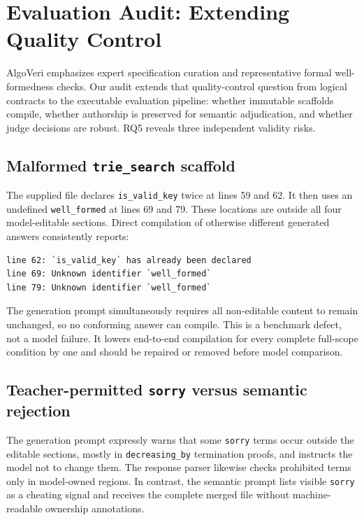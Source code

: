 \documentclass{article}
\newcommand{\task}[1]{\texttt{#1}}
\begin{document}
\section{Evaluation Audit: Extending Quality Control}
\label{sec:benchmark-audit}

AlgoVeri emphasizes expert specification curation and representative formal
well-formedness checks.  Our audit extends that quality-control question from logical
contracts to the executable evaluation pipeline: whether immutable scaffolds compile,
whether authorship is preserved for semantic adjudication, and whether judge decisions
are robust.  RQ5 reveals three independent validity risks.

\subsection{Malformed \task{trie\_search} scaffold}
\label{sec:trie-defect}

The supplied file declares \texttt{is\_valid\_key} twice at lines 59 and 62.  It then
uses an undefined \texttt{well\_formed} at lines 69 and 79.  These locations are outside
all four model-editable sections.  Direct compilation of otherwise different generated
answers consistently reports:

\begin{lstlisting}
line 62: `is_valid_key` has already been declared
line 69: Unknown identifier `well_formed`
line 79: Unknown identifier `well_formed`
\end{lstlisting}

The generation prompt simultaneously requires all non-editable content to remain
unchanged, so no conforming answer can compile.  This is a benchmark defect, not a model
failure.  It lowers end-to-end compilation for every complete full-scope condition by
one and should be repaired or removed before model comparison.

\subsection{Teacher-permitted \texttt{sorry} versus semantic rejection}
\label{sec:sorry-conflict}

The generation prompt expressly warns that some \texttt{sorry} terms occur outside the
editable sections, mostly in \texttt{decreasing\_by} termination proofs, and instructs
the model not to change them.  The response parser likewise checks prohibited terms
only in model-owned regions.  In contrast, the semantic prompt lists visible
\texttt{sorry} as a cheating signal and receives the complete merged file without
machine-readable ownership annotations.
\end{document}
